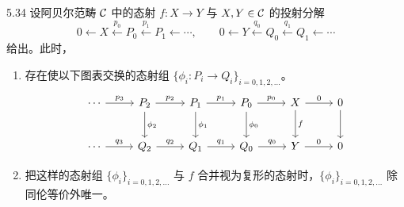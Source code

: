 \begin{lemma}{5.34}
设阿贝尔范畴 $\mathcal{C}$ 中的态射 $f\colon X\to Y$ 与 $X, Y\in\mathcal{C}$ 的投射分解
\[
  0\leftarrow X\xleftarrow{p_0}P_0\xleftarrow{p_1}P_1\leftarrow\cdots,\qquad
  0\leftarrow Y\xleftarrow{q_0}Q_0\xleftarrow{q_1}Q_1\leftarrow\cdots
\]
给出。此时，
\begin{enumerate}[label=(\roman*)]
  \item 存在使以下图表交换的态射组 $\{\phi_i\colon P_i\to Q_i\}_{i=0,1,2,\ldots}$。
\[\begin{tikzcd}[row sep=2.4em, column sep=2.5em]
\cdots \arrow[r,"p_3"] & P_2 \arrow[r,"p_2"] \arrow[d,"\phi_2"] & P_1 \arrow[r,"p_1"] \arrow[d,"\phi_1"] & P_0 \arrow[r,"p_0"] \arrow[d,"\phi_0"] & X \arrow[r,"0"] \arrow[d,"f"] & 0 \arrow[d] \\
\cdots \arrow[r,"q_3"] & Q_2 \arrow[r,"q_2"] & Q_1 \arrow[r,"q_1"] & Q_0 \arrow[r,"q_0"] & Y \arrow[r,"0"] & 0
\end{tikzcd}\]
  \item 把这样的态射组 $\{\phi_i\}_{i=0,1,2,\ldots}$ 与 $f$ 合并视为复形的态射时，$\{\phi_i\}_{i=0,1,2,\ldots}$ 除同伦等价外唯一。
\end{enumerate}
\end{lemma}


